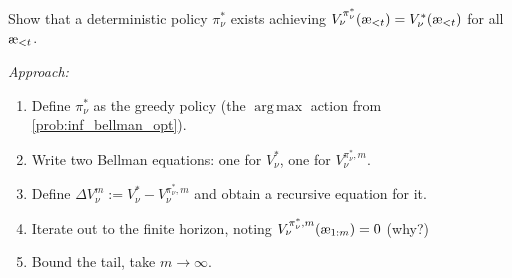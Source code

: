 \documentclass[fontsize=11pt, parskip=half]{scrartcl}
\DeclareMathOperator*{\argmax}{arg\,max}
\newcommand{\aes}{\textnormal{\ae}}
\begin{document}
\begin{exercise}
\label{prob:inf_opt_policy}
\skippable
Show that a deterministic policy $\pi_\nu^*$ exists achieving $V_\nu^{\pi_\nu^*}(\aes_{<t}) = V_\nu^*(\aes_{<t})$ for all $\aes_{<t}$.


\textit{Approach:}
\begin{enumerate}\itemsep=2pt
    \item Define $\pi_\nu^*$ as the greedy policy (the $\argmax$ action from \cref{prob:inf_bellman_opt}).
    \item Write two Bellman equations: one for $V_\nu^*$, one for $V_\nu^{\pi_\nu^*, m}$.
    \item Define $\Delta V_\nu^m := V_\nu^* - V_\nu^{\pi_\nu^*, m}$ and obtain a recursive equation for it.
    \item Iterate out to the finite horizon, noting $V_\nu^{\pi_\nu^*, m}(\aes_{1:m}) = 0$ (why?)
    \item Bound the tail, take $m \to \infty$.
\end{enumerate}
\end{exercise}
\end{document}
